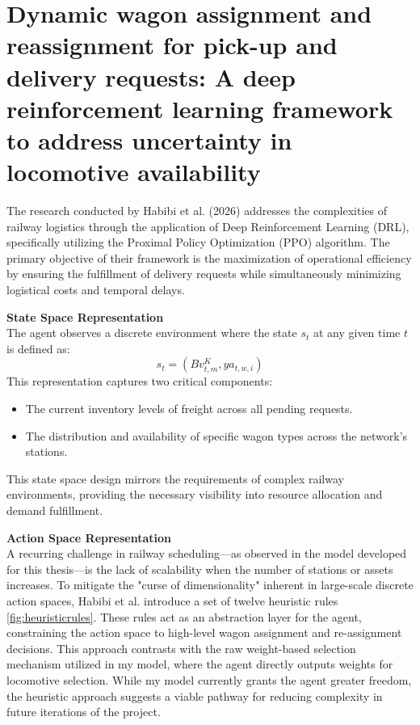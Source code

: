 \documentclass[a4paper]{scrartcl}
\begin{document}
\section{Dynamic wagon assignment and reassignment for pick-up and delivery requests: A deep reinforcement learning framework to address uncertainty in locomotive availability}
The research conducted by Habibi et al. (2026) \cite{HABIBI2026114351} addresses the complexities of railway logistics through the application of Deep Reinforcement Learning (DRL), specifically utilizing the Proximal Policy Optimization (PPO) algorithm. The primary objective of their framework is the maximization of operational efficiency by ensuring the fulfillment of delivery requests while simultaneously minimizing logistical costs and temporal delays.

\textbf{State Space Representation} \\
The agent observes a discrete environment where the state $s_t$ at any given time $t$ is defined as:
$$
s_t = ( B v_{t,m}^K , y a_{t,w,i})
$$
This representation captures two critical components: 
\begin{itemize}
    \item The current inventory levels of freight across all pending requests.
    \item The distribution and availability of specific wagon types across the network's stations.
\end{itemize}
This state space design mirrors the requirements of complex railway environments, providing the necessary visibility into resource allocation and demand fulfillment.

\textbf{Action Space Representation} \\
A recurring challenge in railway scheduling—as observed in the model developed for this thesis—is the lack of scalability when the number of stations or assets increases. To mitigate the "curse of dimensionality" inherent in large-scale discrete action spaces, Habibi et al. introduce a set of twelve heuristic rules \ref{fig:heuristicrules}. These rules act as an abstraction layer for the agent, constraining the action space to high-level wagon assignment and re-assignment decisions. This approach contrasts with the raw weight-based selection mechanism utilized in my model, where the agent directly outputs weights for locomotive selection. While my model currently grants the agent greater freedom, the heuristic approach suggests a viable pathway for reducing complexity in future iterations of the project.
\end{document}
